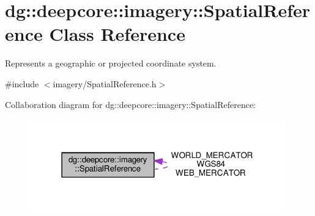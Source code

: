 \hypertarget{classdg_1_1deepcore_1_1imagery_1_1_spatial_reference}{}\section{dg\+:\+:deepcore\+:\+:imagery\+:\+:Spatial\+Reference Class Reference}
\label{classdg_1_1deepcore_1_1imagery_1_1_spatial_reference}


Represents a geographic or projected coordinate system.  




{\ttfamily \#include $<$imagery/\+Spatial\+Reference.\+h$>$}



Collaboration diagram for dg\+:\+:deepcore\+:\+:imagery\+:\+:Spatial\+Reference\+:
\nopagebreak
\begin{figure}[H]
\begin{center}
\leavevmode
\includegraphics[width=315pt]{classdg_1_1deepcore_1_1imagery_1_1_spatial_reference__coll__graph}
\end{center}
\end{figure}
